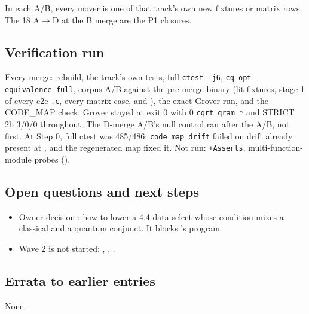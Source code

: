In each A/B, every mover is one of that track's own new fixtures or matrix rows.
The 18 A$\to$D at the B merge are the P1 closures.

\subsection*{Verification run}
Every merge: rebuild, the track's own tests, full \texttt{ctest -j6},
\texttt{cq-opt-equivalence-full}, corpus A/B against the pre-merge binary (lit
fixtures, stage 1 of every e2e \texttt{.c}, every matrix case, and
), the exact Grover run, and the CODE\_MAP check.
Grover stayed at exit 0 with 0 \texttt{cqrt\_qram\_*} and STRICT 2b 3/0/0
throughout. The D-merge A/B's null control ran after the A/B, not first. At
Step 0, full ctest was 485/486: \texttt{code\_map\_drift} failed on drift
already present at , and the regenerated map fixed it. Not
run: \texttt{+Asserts}, multi-function-module probes ().

\subsection*{Open questions and next steps}
\begin{itemize}
  \item Owner decision : how to lower a 4.4 data select whose
    condition mixes a classical and a quantum conjunct. It blocks
    's program.
  \item Wave 2 is not started: , , .
\end{itemize}

\subsection*{Errata to earlier entries}
None.
